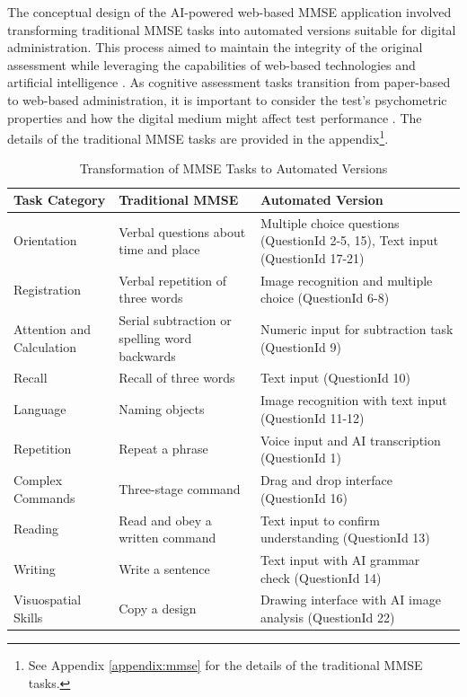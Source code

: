 The conceptual design of the AI-powered web-based MMSE application involved transforming traditional MMSE tasks into automated versions suitable for digital administration. This process aimed to maintain the integrity of the original assessment \cite{Folstein1975} while leveraging the capabilities of web-based technologies and artificial intelligence \cite{Bauer2012, Zygouris2017}. As cognitive assessment tasks transition from paper-based to web-based administration, it is important to consider the test's psychometric properties and how the digital medium might affect test performance \cite{Geddes2020}. The details of the traditional MMSE tasks are provided in the appendix\footnote{See Appendix \ref{appendix:mmse} for the details of the traditional MMSE tasks.}.

\begin{table}[h]
\centering
\caption{Transformation of MMSE Tasks to Automated Versions}
\begin{tabular}{|p{}|p{}|p{}|}
\hline
\textbf{Task Category} & \textbf{Traditional MMSE} & \textbf{Automated Version} \\
\hline
Orientation & Verbal questions about time and place & Multiple choice questions (QuestionId 2-5, 15), Text input (QuestionId 17-21) \\
\hline
Registration & Verbal repetition of three words & Image recognition and multiple choice (QuestionId 6-8) \\
\hline
Attention and Calculation & Serial subtraction or spelling word backwards & Numeric input for subtraction task (QuestionId 9) \\
\hline
Recall & Recall of three words & Text input (QuestionId 10) \\
\hline
Language & Naming objects & Image recognition with text input (QuestionId 11-12) \\
\hline
Repetition & Repeat a phrase & Voice input and AI transcription (QuestionId 1) \\
\hline
Complex Commands & Three-stage command & Drag and drop interface (QuestionId 16) \\
\hline
Reading & Read and obey a written command & Text input to confirm understanding (QuestionId 13) \\
\hline
Writing & Write a sentence & Text input with AI grammar check (QuestionId 14) \\
\hline
Visuospatial Skills & Copy a design & Drawing interface with AI image analysis (QuestionId 22) \\
\hline
\end{tabular}
\label{tab:mmse-transformation}
\end{table}

